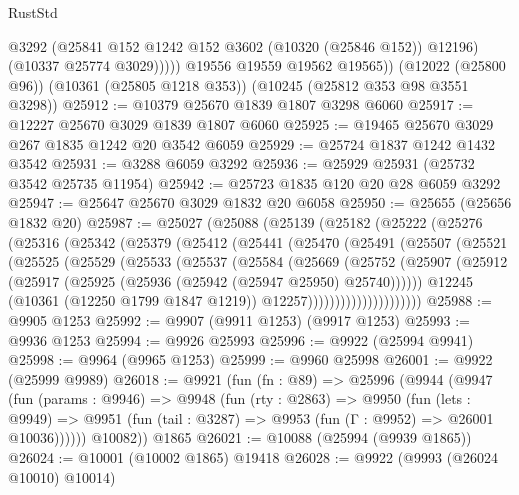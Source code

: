 \begin{lexlean}{RustStd}
\begin{coremodule}
                @3292
                (@25841 @152 @1242 @152 @3602 (@10320 (@25846 @152)) @12196)
                (@10337 @25774 @3029)))))
        @19556
        @19559
        @19562
        @19565))
    (@12022 (@25800 @96))
    (@10361 (@25805 @1218 @353))
    (@10245 (@25812 @353 @98 @3551 @3298))
@25912 := @10379 @25670 @1839 @1807 @3298 @6060
@25917 := @12227 @25670 @3029 @1839 @1807 @6060
@25925 := @19465 @25670 @3029 @267 @1835 @1242 @20 @3542 @6059
@25929 := @25724 @1837 @1242 @1432 @3542
@25931 := @3288 @6059 @3292
@25936 := @25929 @25931 (@25732 @3542 @25735 @11954)
@25942 := @25723 @1835 @120 @20 @28 @6059 @3292
@25947 := @25647 @25670 @3029 @1832 @20 @6058
@25950 := @25655 (@25656 @1832 @20)
@25987 := @25027
    (@25088
      (@25139
        (@25182
          (@25222
            (@25276
              (@25316
                (@25342
                  (@25379
                    (@25412
                      (@25441
                        (@25470
                          (@25491
                            (@25507
                              (@25521
                                (@25525
                                  (@25529
                                    (@25533
                                      (@25537
                                        (@25584
                                          (@25669
                                            (@25752
                                              (@25907
                                                (@25912
                                                  (@25917
                                                    (@25925
                                                      (@25936 (@25942 (@25947 @25950) @25740))))))
                                              @12245
                                              (@10361 (@12250 @1799 @1847 @1219))
                                              @12257)))))))))))))))))))))
@25988 := @9905 @1253
@25992 := @9907 (@9911 @1253) (@9917 @1253)
@25993 := @9936 @1253
@25994 := @9926 @25993
@25996 := @9922 (@25994 @9941)
@25998 := @9964 (@9965 @1253)
@25999 := @9960 @25998
@26001 := @9922 (@25999 @9989)
@26018 := @9921
    (fun (fn : @89) =>
    @25996
      (@9944
        (@9947
          (fun (params : @9946) =>
          @9948
            (fun (rty : @2863) =>
            @9950
              (fun (lets : @9949) =>
              @9951 (fun (tail : @3287) => @9953 (fun (Γ : @9952) => @26001 @10036))))))
        @10082))
    @1865
@26021 := @10088 (@25994 (@9939 @1865))
@26024 := @10001 (@10002 @1865) @19418
@26028 := @9922 (@9993 (@26024 @10010) @10014)

\end{coremodule}
\end{lexlean}
